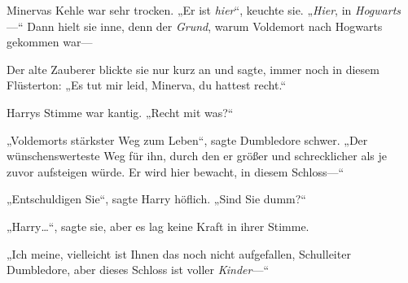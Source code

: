 %
Minervas Kehle war sehr trocken. „Er ist \emph{hier}“, keuchte sie. „\emph{Hier}, in \emph{Hogwarts}—“ Dann hielt sie inne, denn der \emph{Grund}, warum Voldemort nach Hogwarts gekommen war—

Der alte Zauberer blickte sie nur kurz an und sagte, immer noch in diesem Flüsterton:
„Es tut mir leid, Minerva, du hattest recht.“

Harrys Stimme war kantig. „Recht mit was?“

„Voldemorts stärkster Weg zum Leben“, sagte Dumbledore schwer. „Der wünschenswerteste Weg für ihn, durch den er größer und schrecklicher als je zuvor aufsteigen würde. Er wird hier bewacht, in diesem Schloss—“

„Entschuldigen Sie“, sagte Harry höflich. „Sind Sie dumm?“

„Harry…“, sagte sie, aber es lag keine Kraft in ihrer Stimme.

„Ich meine, vielleicht ist Ihnen das noch nicht aufgefallen, Schulleiter Dumbledore, aber dieses Schloss ist voller \emph{Kinder}—“

